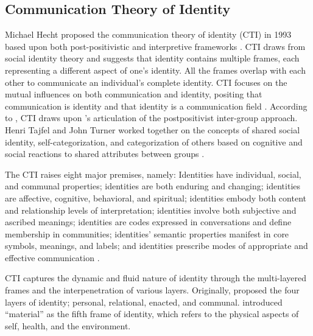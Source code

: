 \subsection{Communication Theory of Identity}

Michael Hecht proposed the communication theory of identity (CTI) in 1993 based upon both post-positivistic and interpretive frameworks \citep{hecht2002ResearchOdyssey1993, shinCommunicationTheoryIdentity2017}. CTI draws from social identity theory and suggests that identity contains multiple frames, each representing a different aspect of one’s identity. All the frames overlap with each other to communicate an individual's complete identity. CTI focuses on the mutual influences on both communication and identity, positing that communication is identity and that identity is a communication field \citep{hechtCommunicationTheoryIdentity2021, jungElaboratingCommunicationTheory2004, shinCommunicationTheoryIdentity2017}. According to \citet{hechtCommunicationTheoryIdentity2021}, CTI draws upon \citet{tajfel1979integrative}'s articulation of the postpositivist inter-group approach. Henri Tajfel and John Turner worked together on the concepts of shared social identity, self-categorization, and categorization of others based on cognitive and social reactions to shared attributes between groups \citep{hechtCommunicationTheoryIdentity2021, hecht2002ResearchOdyssey1993}. 

The CTI raises eight major premises, namely: Identities have individual, social, and communal properties; identities are both enduring and changing; identities are affective, cognitive, behavioral, and spiritual; identities embody both content and relationship levels of interpretation; identities involve both subjective and ascribed meanings; identities are codes expressed in conversations and define membership in communities; identities’ semantic properties manifest in core symbols, meanings, and labels; and identities prescribe modes of appropriate and effective communication \citep[p.~79]{hecht2002ResearchOdyssey1993}.

CTI captures the dynamic and fluid nature of identity through the multi-layered frames and the interpenetration of various layers. Originally, \citet{hecht2002ResearchOdyssey1993} proposed the four layers of identity; personal, relational, enacted, and communal. \citet{kuiperCommunicationTheoryIdentity2021} introduced ``material'' as the fifth frame of identity, which refers to the physical aspects of self, health, and the environment.

